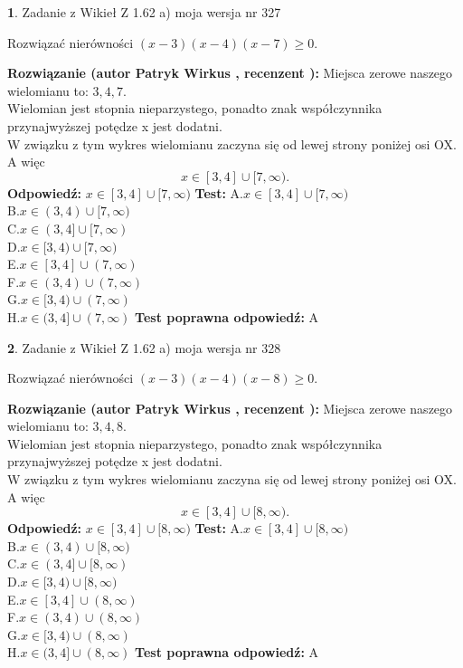 \documentclass[12pt, a4paper]{article}
\theoremstyle{definition} %
\newtheorem{zad}{}
\newcommand{\zadStart}[1]{\begin{zad}#1\newline}
\newcommand{\zadStop}{\end{zad}}
\newcommand{\rozwStart}[2]{\noindent \textbf{Rozwiązanie (autor #1 , recenzent #2): }\newline}
\newcommand{\rozwStop}{\newline}
\newcommand{\odpStart}{\noindent \textbf{Odpowiedź:}\newline}
\newcommand{\odpStop}{\newline}
\newcommand{\testStart}{\noindent \textbf{Test:}\newline}
\newcommand{\testStop}{\newline}
\newcommand{\kluczStart}{\noindent \textbf{Test poprawna odpowiedź:}\newline}
\newcommand{\kluczStop}{\newline}
\begin{document}
\zadStart{Zadanie z Wikieł Z 1.62 a) moja wersja nr 327}

Rozwiązać nierówności $(x-3)(x-4)(x-7)\ge0$.
\zadStop
\rozwStart{Patryk Wirkus}{}
Miejsca zerowe naszego wielomianu to: $3, 4, 7$.\\
Wielomian jest stopnia nieparzystego, ponadto znak współczynnika przy\linebreak najwyższej potędze x jest dodatni.\\ W związku z tym wykres wielomianu zaczyna się od lewej strony poniżej osi OX. A więc $$x \in [3,4] \cup [7,\infty).$$
\rozwStop
\odpStart
$x \in [3,4] \cup [7,\infty)$
\odpStop
\testStart
A.$x \in [3,4] \cup [7,\infty)$\\
B.$x \in (3,4) \cup [7,\infty)$\\
C.$x \in (3,4] \cup [7,\infty)$\\
D.$x \in [3,4) \cup [7,\infty)$\\
E.$x \in [3,4] \cup (7,\infty)$\\
F.$x \in (3,4) \cup (7,\infty)$\\
G.$x \in [3,4) \cup (7,\infty)$\\
H.$x \in (3,4] \cup (7,\infty)$
\testStop
\kluczStart
A
\kluczStop



\zadStart{Zadanie z Wikieł Z 1.62 a) moja wersja nr 328}

Rozwiązać nierówności $(x-3)(x-4)(x-8)\ge0$.
\zadStop
\rozwStart{Patryk Wirkus}{}
Miejsca zerowe naszego wielomianu to: $3, 4, 8$.\\
Wielomian jest stopnia nieparzystego, ponadto znak współczynnika przy\linebreak najwyższej potędze x jest dodatni.\\ W związku z tym wykres wielomianu zaczyna się od lewej strony poniżej osi OX. A więc $$x \in [3,4] \cup [8,\infty).$$
\rozwStop
\odpStart
$x \in [3,4] \cup [8,\infty)$
\odpStop
\testStart
A.$x \in [3,4] \cup [8,\infty)$\\
B.$x \in (3,4) \cup [8,\infty)$\\
C.$x \in (3,4] \cup [8,\infty)$\\
D.$x \in [3,4) \cup [8,\infty)$\\
E.$x \in [3,4] \cup (8,\infty)$\\
F.$x \in (3,4) \cup (8,\infty)$\\
G.$x \in [3,4) \cup (8,\infty)$\\
H.$x \in (3,4] \cup (8,\infty)$
\testStop
\kluczStart
A
\kluczStop
\end{document}

